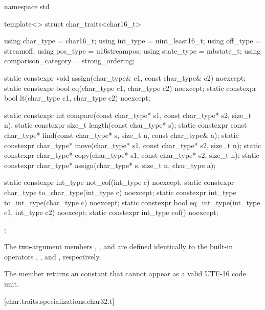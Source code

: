 %
\begin{codeblock}
namespace std {
  template<> struct char_traits<char16_t> {
    using char_type  = char16_t;
    using int_type   = uint_least16_t;
    using off_type   = streamoff;
    using pos_type   = u16streampos;
    using state_type = mbstate_t;
    using comparison_category = strong_ordering;

    static constexpr void assign(char_type& c1, const char_type& c2) noexcept;
    static constexpr bool eq(char_type c1, char_type c2) noexcept;
    static constexpr bool lt(char_type c1, char_type c2) noexcept;

    static constexpr int compare(const char_type* s1, const char_type* s2, size_t n);
    static constexpr size_t length(const char_type* s);
    static constexpr const char_type* find(const char_type* s, size_t n,
                                           const char_type& a);
    static constexpr char_type* move(char_type* s1, const char_type* s2, size_t n);
    static constexpr char_type* copy(char_type* s1, const char_type* s2, size_t n);
    static constexpr char_type* assign(char_type* s, size_t n, char_type a);

    static constexpr int_type not_eof(int_type c) noexcept;
    static constexpr char_type to_char_type(int_type c) noexcept;
    static constexpr int_type to_int_type(char_type c) noexcept;
    static constexpr bool eq_int_type(int_type c1, int_type c2) noexcept;
    static constexpr int_type eof() noexcept;
  };
}
\end{codeblock}


\pnum
The two-argument members ,
, and  are defined identically to
the built-in operators \tcode{=}, \tcode{==}, and
\tcode{<}, respectively.

\pnum
The member  returns an
 constant that cannot appear
as a valid UTF-16 code unit.

[char.traits.specializations.char32.t]{}

